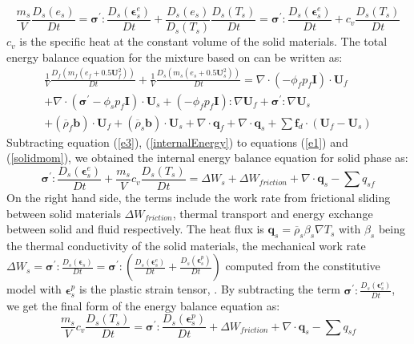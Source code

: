 \documentclass[preprint,12pt]{elsarticle}
\begin{document}
%
%
\begin{equation}
   \frac{m_s}{V} \frac{D_s( e_s)}{Dt} = \pmb{\sigma}^\prime :\frac{D_s( \pmb{\epsilon}_s^e)}{Dt} + \frac{D_s( e_s)}{D_s (T_s)} \frac{D_s( T_s)}{Dt} = \pmb{\sigma}^\prime :\frac{D_s( \pmb{\epsilon}_s^e)}{Dt} + c_v \frac{D_s( T_s)}{Dt}
\label{internalEnergy}
\end {equation}
%
%
$c_v$ is the specific heat at the constant volume of the solid materials. The total energy balance equation for the mixture based on \cite{Hassanizadeh} can be written as:\\
%
%
\begin{equation}
\label{e3}
\begin{gathered}
     \frac{1}{V}\frac{D_f(m_f (e_f+0.5\pmb{U}_f^2))}{Dt} + \frac{1}{V}\frac{D_s(m_s (e_s+0.5\pmb{U}_s^2))}{Dt} = \nabla \cdot (-\phi_f p_f\pmb{I}) \cdot \pmb{U}_f \\
     + \nabla \cdot (\pmb{\sigma}^\prime-\phi_s p_f\pmb{I}) \cdot \pmb{U}_s + (-\phi_f p_f\pmb{I}) : \nabla \pmb{U}_f + \pmb{\sigma}^\prime : \nabla \pmb{U}_s \\
     + (\overline{\rho}_f \pmb{b}) \cdot \pmb{U}_f + (\overline{\rho}_s \pmb{b}) \cdot \pmb{U}_s
     + \nabla \cdot \pmb{q}_f + \nabla \cdot \pmb{q}_s +  \sum \pmb{f}_{d} \cdot (\pmb{U}_f - \pmb{U}_s)  
\end {gathered}
\end {equation}
%
%
Subtracting equation (\ref{e3}), (\ref{internalEnergy}) to equations (\ref{e1}) and (\ref{solidmom}), we obtained the internal energy balance equation for solid phase as:
%
%
\begin{equation}
      \pmb{\sigma}^\prime :\frac{D_s( \pmb{\epsilon}_s^e)}{Dt}  + \frac{m_s}{V} c_v \frac{D_s( T_s)}{Dt} = \Delta W_{s} +  \Delta W_{friction} + \nabla \cdot \pmb{q}_s -  \sum q_{sf} 
\end {equation}
%
%
On the right hand side, the terms include the work rate from frictional sliding between solid materials  $\Delta W_{friction}$, thermal transport and energy exchange between solid and fluid respectively. The heat flux is $\pmb{q}_s = \overline{\rho}_s \beta_s \nabla T_s$ with $\beta_s$ being the thermal conductivity of the solid materials, the mechanical work rate $\Delta W_{s} = \pmb{\sigma}^\prime :\frac{D_s( \pmb{\epsilon}_s)}{Dt}  = \pmb{\sigma}^\prime : (\frac{D_s( \pmb{\epsilon}_s^e)}{Dt}  + \frac{D_s( \pmb{\epsilon}_s^p)}{Dt}) $ computed from the constitutive model with $\pmb{\epsilon}_s^p$ is the plastic strain tensor, . By subtracting the term $\pmb{\sigma}^\prime : \frac{D_s( \pmb{\epsilon}_s^e)}{Dt}$, we get the final form of the energy balance equation as:
%
%
\begin{equation}
      \frac{m_s}{V} c_v \frac{D_s( T_s)}{Dt} = \pmb{\sigma}^\prime : \frac{D_s( \pmb{\epsilon}_s^p)}{Dt} +  \Delta W_{friction} + \nabla \cdot \pmb{q}_s -  \sum q_{sf} 
\end {equation}
%
%
\end{document}
